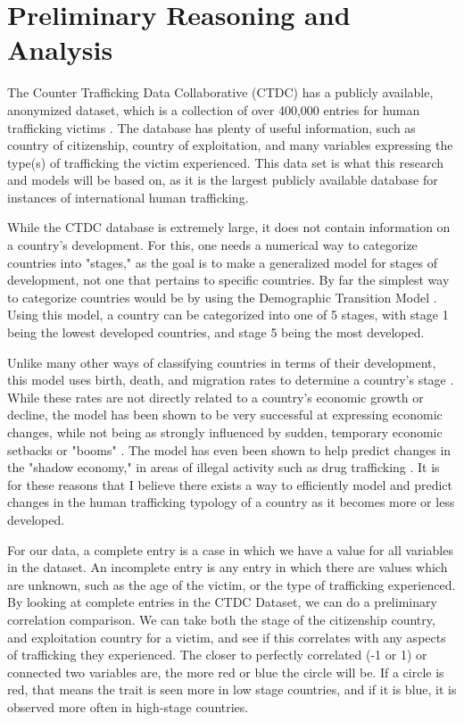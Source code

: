 \documentclass{article} %
\begin{document}
\section{Preliminary Reasoning and Analysis}

The Counter Trafficking Data Collaborative (CTDC) has a publicly available, anonymized dataset, which is a collection of over 400,000 entries for human trafficking victims \parencite{CTDC}. The database has plenty of useful information, such as country of citizenship, country of exploitation, and many variables expressing the type(s) of trafficking the victim experienced. This data set is what this research and models will be based on, as it is the largest publicly available database for instances of international human trafficking.

While the CTDC database is extremely large, it does not contain information on a country's development. For this, one needs a numerical way to categorize countries into "stages," as the goal is to make a generalized model for stages of development, not one that pertains to specific countries. By far the simplest way to categorize countries would be by using the Demographic Transition Model \parencite{bongaarts2009}. Using this model, a country can be categorized into one of 5 stages, with stage 1 being the lowest developed countries, and stage 5 being the most developed.

Unlike many other ways of classifying countries in terms of their development, this model uses birth, death, and migration rates to determine a country's stage \parencite{bongaarts2009}. While these rates are not directly related to a country's economic growth or decline, the model has been shown to be very successful at expressing economic changes, while not being as strongly influenced by sudden, temporary economic setbacks or "booms" \parencite{kirk1996,bar2010,galor2000}. The model has even been shown to help predict changes in the "shadow economy," in areas of illegal activity such as drug trafficking \parencite{sch1994}. It is for these reasons that I believe there exists a way to efficiently model and predict changes in the human trafficking typology of a country as it becomes more or less developed.

For our data, a complete entry is a case in which we have a value for all variables in the dataset. An incomplete entry is any entry in which there are values which are unknown, such as the age of the victim, or the type of trafficking experienced. By looking at complete entries in the CTDC Dataset, we can do a preliminary correlation comparison. We can take both the stage of the citizenship country, and exploitation country for a victim, and see if this correlates with any aspects of trafficking they experienced. The closer to perfectly correlated (-1 or 1) or connected two variables are, the more red or blue the circle will be. If a circle is red, that means the trait is seen more in low stage countries, and if it is blue, it is observed more often in high-stage countries.
\end{document}

